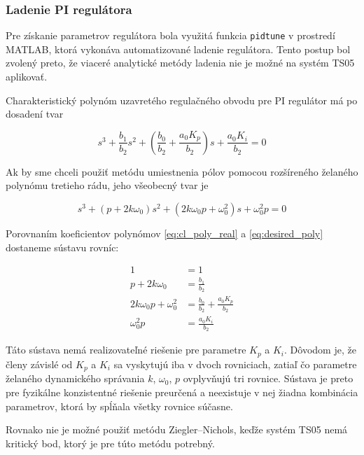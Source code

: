 \subsubsection{Ladenie PI regulátora}

Pre získanie parametrov regulátora bola využitá funkcia \texttt{pidtune} v prostredí MATLAB, ktorá vykonáva automatizované ladenie regulátora.  
Tento postup bol zvolený preto, že viaceré analytické metódy ladenia nie je možné na systém TS05 aplikovať.

Charakteristický polynóm uzavretého regulačného obvodu pre PI regulátor má po dosadení tvar

\begin{equation}
	s^3 
	+ \frac{b_1}{b_2} s^2 
	+ \left( \frac{b_0}{b_2} + \frac{a_0 K_p}{b_2} \right) s 
	+ \frac{a_0 K_i}{b_2} 
	= 0
	\label{eq:cl_poly_real}
\end{equation}

Ak by sme chceli použiť metódu umiestnenia pólov pomocou rozšíreného želaného polynómu tretieho rádu, jeho všeobecný tvar je

\begin{equation}
	s^3 + (p + 2 k \omega_0) s^2 + (2 k \omega_0 p + \omega_0^2) s + \omega_0^2 p = 0
	\label{eq:desired_poly}
\end{equation}

Porovnaním koeficientov polynómov \eqref{eq:cl_poly_real} a \eqref{eq:desired_poly} dostaneme sústavu rovníc:

\begin{align}
	1 &= 1
	\label{eq:compare1} \\
	p + 2 k \omega_0 &= \frac{b_1}{b_2}
	\label{eq:compare2} \\
	2 k \omega_0 p + \omega_0^2 &= \frac{b_0}{b_2} + \frac{a_0 K_p}{b_2}
	\label{eq:compare3} \\
	\omega_0^2 p &= \frac{a_0 K_i}{b_2}
	\label{eq:compare4}
\end{align}

Táto sústava nemá realizovateľné riešenie pre parametre $K_p$ a $K_i$.  
Dôvodom je, že členy závislé od $K_p$ a $K_i$ sa vyskytujú iba v dvoch rovniciach, zatiaľ čo parametre želaného dynamického správania $k$, $\omega_0$, $p$ ovplyvňujú tri rovnice.  
Sústava je preto pre fyzikálne konzistentné riešenie preurčená a neexistuje v nej žiadna kombinácia parametrov, ktorá by spĺňala všetky rovnice súčasne.

Rovnako nie je možné použiť metódu Ziegler–Nichols, keďže systém TS05 nemá kritický bod, ktorý je pre túto metódu potrebný.

